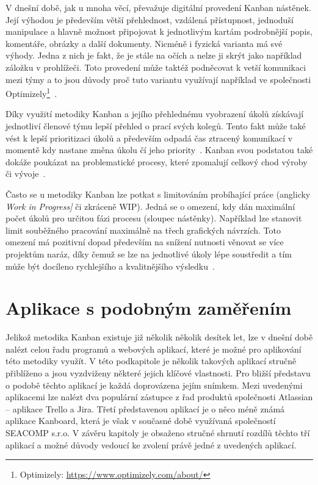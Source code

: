 V dnešní době, jak u mnoha věcí, převažuje digitální provedení Kanban nástěnek. Její výhodou je především větší přehlednost, vzdálená přístupnost, jednoduší manipulace a hlavně možnost připojovat k jednotlivým kartám podrobnější popis, komentáře, obrázky a další dokumenty. Nicméně i fyzická varianta má své výhody. Jedna z nich je fakt, že je stále na očích a nelze ji skrýt jako například záložku v prohlížeči. Toto provedení může taktéž podněcovat k vetší komunikaci mezi týmy a to jsou důvody proč tuto variantu využívají například ve společnosti Optimizely\footnote{Optimizely: \url{https://www.optimizely.com/about/}}~\cite{bib:kanban-atlassian}.

Díky využití metodiky Kanban a jejího přehlednému vyobrazení úkolů získávají jednotliví členové týmu lepší přehled o prací svých kolegů. Tento fakt může také vést k lepší prioritizaci úkolů a především odpadá čas ztracený komunikací v momentě kdy nastane změna úkolu čí jeho priority~\cite{bib:kanban-101}.
Kanban svou podstatou také dokáže poukázat na problematické procesy, které zpomalují celkový chod výroby či vývoje~\cite{bib:kanban-and-scrum}.

Často se u metodiky Kanban lze potkat s limitováním probíhající práce (anglicky \emph{Work in Progress]} či zkráceně WIP). Jedná se o omezení, kdy dán maximální počet úkolů pro určitou fázi procesu (sloupec nástěnky). Například lze stanovit limit souběžného pracování maximálně na třech grafických návrzích. Toto omezení má pozitivní dopad především na snížení nutnosti věnovat se více projektům naráz, díky čemuž se lze na jednotlivé úkoly lépe soustředit a tím může být docíleno rychlejšího a kvalitnějšího výsledku~\cite{bib:kanban-101}.

\section{Aplikace s podobným zaměřením}\label{sec:apps}
Jelikož metodika Kanban existuje již několik několik desítek let, lze v dnešní době nalézt celou řadu programů a webových aplikací, které je možné pro aplikování této metodiky využít. V této podkapitole je několik takových aplikací stručně přiblíženo a jsou vyzdviženy některé jejich klíčové vlastnosti. Pro bližší představu o podobě těchto aplikací je každá doprovázena jejím snímkem. Mezi uvedenými aplikacemi lze nalézt dva populární zástupce z řad produktů společnosti Atlassian -- aplikace Trello a Jira. Třetí představenou aplikací je o něco méně známá aplikace Kanboard, která je však v současné době využívaná společností SEACOMP s.r.o. V závěru kapitoly je obsaženo stručné shrnutí rozdílů těchto tří aplikací a možné důvody vedoucí ke zvolení právě jedné z uvedených aplikací.

